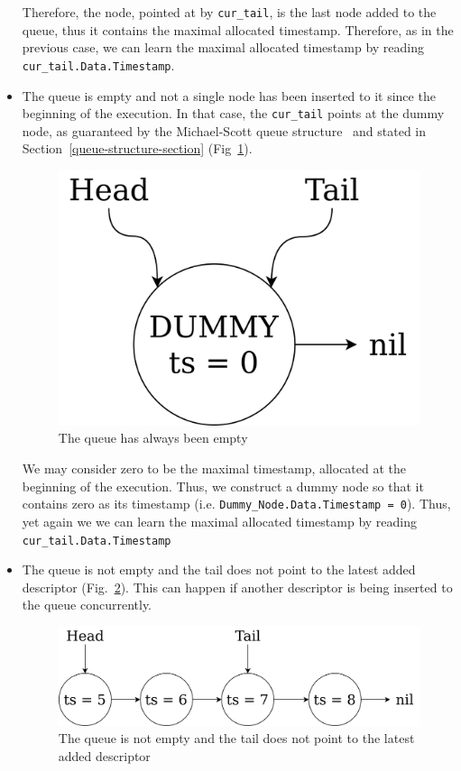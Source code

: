 \documentclass[times, dvipsnames,%
               languages={russian,english} %
              ]{itmo-student-thesis}
\begin{document}
\begin{nenum}
\begin{itemize}
        Therefore, the node, pointed at by \texttt{cur\_tail}, is the last node added to the queue, thus it contains the maximal allocated timestamp. Therefore, as in the previous case, we can learn the maximal allocated timestamp by reading \texttt{cur\_tail.Data.Timestamp}.
        
        \item The queue is empty and not a single node has been inserted to it since the beginning of the execution. In that case, the \texttt{cur\_tail} points at the dummy node, as guaranteed by the Michael-Scott queue structure~\cite{michael1996simple} and stated in Section~\ref{queue-structure-section} (Fig~\ref{root-queue-empty-dummy-pic}). 
        
        \begin{figure}[H]
          \centering
          \caption{The queue has always been empty}
          \label{root-queue-empty-dummy-pic}
          \includegraphics[width=0.5\linewidth]{pics/root-queue-empty-dummy.png}
        \end{figure}
        
        We may consider zero to be the maximal timestamp, allocated at the beginning of the execution. Thus, we construct a dummy node so that it contains zero as its timestamp (i.e. \texttt{Dummy\_Node.Data.Timestamp = 0}). Thus, yet again we we can learn the maximal allocated timestamp by reading \texttt{cur\_tail.Data.Timestamp}
        
        \item The queue is not empty and the tail does not point to the latest added descriptor (Fig.~\ref{root-queue-stale-tail-pic}). This can happen if another descriptor is being inserted to the queue concurrently.
        
        \begin{figure}[H]
          \centering
          \caption{The queue is not empty and the tail does not point to the latest added descriptor}
          \label{root-queue-stale-tail-pic}
          \includegraphics[width=0.7\linewidth]{pics/root-queue-stale-tail.png}
        \end{figure}
        

\end{itemize}
\end{nenum}
\end{document}
